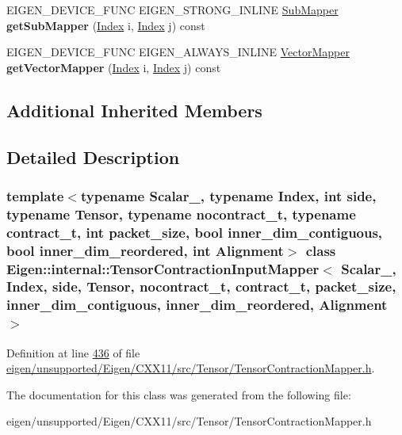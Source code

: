 \begin{DoxyCompactItemize}
\item 
\mbox{\label{class_eigen_1_1internal_1_1_tensor_contraction_input_mapper_a417252fa70b4c7503fc760dd6c5003d5}} 
E\+I\+G\+E\+N\+\_\+\+D\+E\+V\+I\+C\+E\+\_\+\+F\+U\+NC E\+I\+G\+E\+N\+\_\+\+S\+T\+R\+O\+N\+G\+\_\+\+I\+N\+L\+I\+NE \hyperlink{class_eigen_1_1internal_1_1_tensor_contraction_sub_mapper}{Sub\+Mapper} {\bfseries get\+Sub\+Mapper} (\hyperlink{namespace_eigen_a62e77e0933482dafde8fe197d9a2cfde}{Index} i, \hyperlink{namespace_eigen_a62e77e0933482dafde8fe197d9a2cfde}{Index} j) const
\item 
\mbox{\label{class_eigen_1_1internal_1_1_tensor_contraction_input_mapper_af3627247282d759af8296bff58074d6f}} 
E\+I\+G\+E\+N\+\_\+\+D\+E\+V\+I\+C\+E\+\_\+\+F\+U\+NC E\+I\+G\+E\+N\+\_\+\+A\+L\+W\+A\+Y\+S\+\_\+\+I\+N\+L\+I\+NE \hyperlink{class_eigen_1_1internal_1_1_tensor_contraction_sub_mapper}{Vector\+Mapper} {\bfseries get\+Vector\+Mapper} (\hyperlink{namespace_eigen_a62e77e0933482dafde8fe197d9a2cfde}{Index} i, \hyperlink{namespace_eigen_a62e77e0933482dafde8fe197d9a2cfde}{Index} j) const
\end{DoxyCompactItemize}
\subsection*{Additional Inherited Members}


\subsection{Detailed Description}
\subsubsection*{template$<$typename Scalar\+\_\+, typename Index, int side, typename Tensor, typename nocontract\+\_\+t, typename contract\+\_\+t, int packet\+\_\+size, bool inner\+\_\+dim\+\_\+contiguous, bool inner\+\_\+dim\+\_\+reordered, int Alignment$>$\newline
class Eigen\+::internal\+::\+Tensor\+Contraction\+Input\+Mapper$<$ Scalar\+\_\+, Index, side, Tensor, nocontract\+\_\+t, contract\+\_\+t, packet\+\_\+size, inner\+\_\+dim\+\_\+contiguous, inner\+\_\+dim\+\_\+reordered, Alignment $>$}



Definition at line \hyperlink{eigen_2unsupported_2_eigen_2_c_x_x11_2src_2_tensor_2_tensor_contraction_mapper_8h_source_l00436}{436} of file \hyperlink{eigen_2unsupported_2_eigen_2_c_x_x11_2src_2_tensor_2_tensor_contraction_mapper_8h_source}{eigen/unsupported/\+Eigen/\+C\+X\+X11/src/\+Tensor/\+Tensor\+Contraction\+Mapper.\+h}.



The documentation for this class was generated from the following file\+:\begin{DoxyCompactItemize}
\item 
eigen/unsupported/\+Eigen/\+C\+X\+X11/src/\+Tensor/\+Tensor\+Contraction\+Mapper.\+h\end{DoxyCompactItemize}
